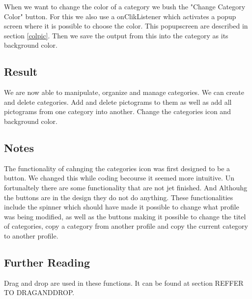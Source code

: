 
When we want to change the color of a category we bush the "Change Category Color" button. 
For this we also use a onClikListener which activates a popup screen where it is possible to choose the color. This popupscreen are described in section \autoref{colpic}.
Then we save the output from this into the category as its background color. 

\subsection*{Result}
We are now able to manipulate, organize and manage categories. We can create and delete categories. 
Add and delete pictograms to them as well as add all pictograms from one category into another. 
Change the categories icon and background color.


\subsection*{Notes}
The functionality of cahnging the categories icon was first designed to be a button. We changed this while coding becourse it seemed more intuitive. 
Un fortunaltely there are some functionality that are not jet finished. And Althouhg the buttons are in the design they do not do anything. 
These functionalities include the spinner which should have made it possible to change what profile was being modified, as well as the buttons making it possible to change the titel of categories, copy a category from another profile and copy the current category to another profile. 


\subsection*{Further Reading}
Drag and drop are used in these functions. It can be found at section REFFER TO DRAGANDDROP.